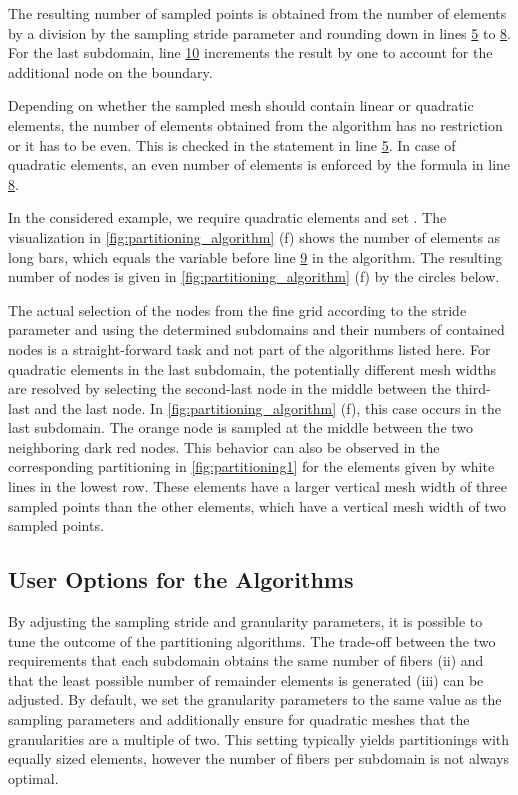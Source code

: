 The resulting number of sampled points is obtained from the number of elements by a division by the sampling stride parameter and rounding down in lines \hyperlink{alg:4.5}{5} to \hyperlink{alg:4.8}{8}. For the last subdomain, line \hyperlink{alg:4.10}{10} increments the result by one to account for the additional node on the boundary.

Depending on whether the sampled mesh should contain linear or quadratic elements, the number of elements obtained from the algorithm has no restriction or it has to be even. This is checked in the  statement in line \hyperlink{alg:4.5}{5}. In case of quadratic elements, an even number of elements is enforced by the formula in line \hyperlink{alg:4.8}{8}.

In the considered example, we require quadratic elements and set . The visualization in \cref{fig:partitioning_algorithm} (f) shows the number of elements as long bars, which equals the  variable before line \hyperlink{alg:4.9}{9} in the algorithm. The resulting number of nodes is given in \cref{fig:partitioning_algorithm} (f) by the circles below.

The actual selection of the nodes from the fine grid according to the stride parameter and using the determined subdomains and their numbers of contained nodes is a straight-forward task and not part of the algorithms listed here. For quadratic elements in the last subdomain, the potentially different mesh widths are resolved by selecting the second-last node in the middle between the third-last and the last node. In \cref{fig:partitioning_algorithm} (f), this case occurs in the last subdomain. The orange node is sampled at the middle between the two neighboring dark red nodes. This behavior can also be observed in the corresponding partitioning in \cref{fig:partitioning1} for the elements given by white lines in the lowest row. These elements have a larger vertical mesh width of three sampled points than the other elements, which have a vertical mesh width of two sampled points.

\subsection{User Options for the Algorithms}\label{sec:partitioning_user_options}

By adjusting the sampling stride and granularity parameters, it is possible to tune the outcome of the partitioning algorithms.
The trade-off between the two requirements that each subdomain obtains the same number of fibers  (ii) and that the least possible number of remainder elements is generated (iii) can be adjusted. By default, we set the granularity parameters to the same value as the sampling parameters and additionally ensure  for quadratic meshes that the granularities are a multiple of two. This setting typically yields partitionings with equally sized elements, however the number of fibers per subdomain is not always optimal.


